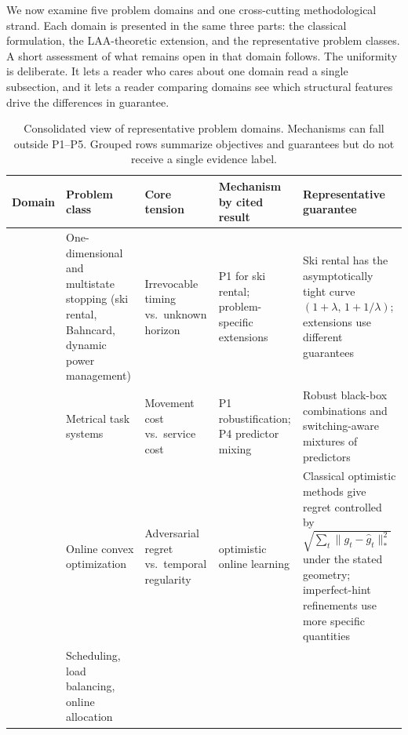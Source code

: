 \documentclass[acmsmall,screen,nonacm]{acmart}
\theoremstyle{acmdefinition}%
\begin{document}
We now examine five problem domains and one cross-cutting methodological strand. Each domain is presented in the same three parts: the classical formulation, the LAA-theoretic extension, and the representative problem classes. A short assessment of what remains open in that domain follows. The uniformity is deliberate. It lets a reader who cares about one domain read a single subsection, and it lets a reader comparing domains see which structural features drive the differences in guarantee.

\begin{table}[t!]
\nomakegapedcells
\centering
\setlength{\tabcolsep}{3pt}
\caption{Consolidated view of representative problem domains. Mechanisms can fall outside P1--P5. Grouped rows summarize objectives and guarantees but do not receive a single evidence label.}
\label{tab:domain_overview}
\fontsize{6.5}{7.25}\selectfont
\begin{tabular}{@{}
    >{\raggedright\arraybackslash}p{1.56cm}
    >{\raggedright\arraybackslash}p{2.67cm}
    >{\raggedright\arraybackslash}p{2.55cm}
    >{\centering\arraybackslash}p{1.23cm}
    >{\raggedright\arraybackslash}p{4.81cm}
@{}}
\toprule
\textbf{Domain} & \textbf{Problem class} & \textbf{Core tension} & \textbf{Mechanism by cited result} & \textbf{Representative guarantee} \\
\midrule
\multirow{4}{=}{\emph{Online optimization} (\S\ref{subsec:online_opt})}
& One-dimensional and multistate stopping (ski rental, Bahncard, dynamic power management)
& Irrevocable timing vs.\ unknown horizon
& P1 for ski rental; problem-specific extensions
& Ski rental has the asymptotically tight curve $(1{+}\lambda,\,1{+}1/\lambda)$; extensions use different guarantees~\cite{purohit2018improving,wei2020optimal,zhao2024bahncard,antoniadis2021power} \\
\addlinespace[1pt]
& Metrical task systems
& Movement cost vs.\ service cost
& P1 robustification; P4 predictor mixing
& Robust black-box combinations and switching-aware mixtures of predictors~\cite{antoniadis2020metric,antoniadis2023mixing} \\
\addlinespace[1pt]
& Online convex optimization
& Adversarial regret vs.\ temporal regularity
& optimistic online learning
& Classical optimistic methods give regret controlled by $\sqrt{\sum_t \|g_t-\hat g_t\|_*^2}$ under the stated geometry; imperfect-hint refinements use more specific quantities~\cite{rakhlin2013predictable,bhaskara2020hints} \\
\addlinespace[1pt]
& Scheduling, load balancing, online allocation

\end{tabular}
\end{table}
\end{document}

